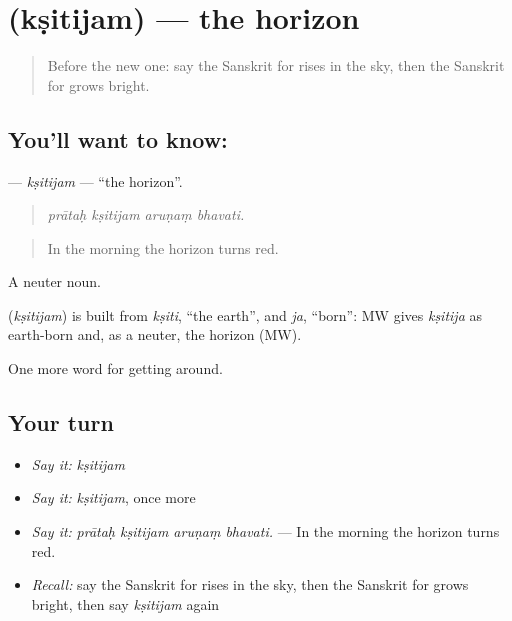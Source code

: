 \section[\texorpdfstring{\sk{क्षितिजम्} (kṣitijam)}{क्षितिजम् (kṣitijam)}]{ (kṣitijam) — the horizon}

\label{lesson:SA-C442-ksitijam}



\begin{quote}
Before the new one: say the Sanskrit for rises in the sky, then the Sanskrit for grows bright.
\end{quote}

\subsection*{You'll want to know: }
\textbf{} — \emph{kṣitijam} — \textquotedblleft{}the horizon\textquotedblright{}.

\begin{quote}
   
\end{quote}

\begin{quote}
\emph{prātaḥ kṣitijam aruṇaṃ bhavati.}
\end{quote}

\begin{quote}
In the morning the horizon turns red.
\end{quote}

A neuter noun.

\begin{cousinweb}
\textbf{} (\emph{kṣitijam}) is built from \emph{kṣiti}, \textquotedblleft{}the earth\textquotedblright{}, and \emph{ja}, \textquotedblleft{}born\textquotedblright{}: MW gives \emph{kṣitija} as earth-born and, as a neuter, the horizon (MW).
\end{cousinweb}

\begin{grammarlens}[title={What you've built}]
One more word for getting around.
\end{grammarlens}

\subsection*{Your turn}
\begin{itemize}
\raggedright
  \item \emph{Say it:} \emph{kṣitijam}
  \item \emph{Say it:} \emph{kṣitijam}, once more
  \item \emph{Say it:} \emph{prātaḥ kṣitijam aruṇaṃ bhavati.} — In the morning the horizon turns red.
  \item \emph{Recall:} say the Sanskrit for rises in the sky, then the Sanskrit for grows bright, then say \emph{kṣitijam} again
\end{itemize}

